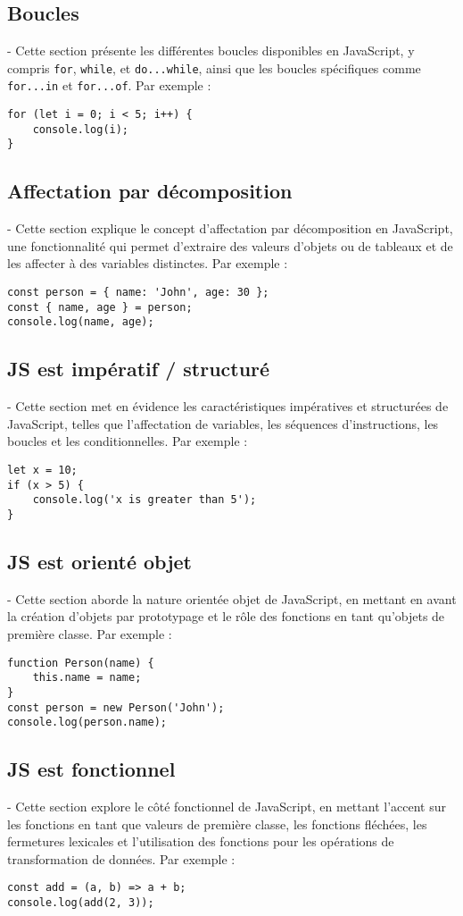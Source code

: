 \documentclass{article}
\begin{document}
\subsection{Boucles}
- Cette section présente les différentes boucles disponibles en JavaScript, y compris \texttt{for}, \texttt{while}, et \texttt{do...while}, ainsi que les boucles spécifiques comme \texttt{for...in} et \texttt{for...of}. Par exemple :
\begin{verbatim}
for (let i = 0; i < 5; i++) {
    console.log(i);
}
\end{verbatim}

\subsection{Affectation par décomposition}
- Cette section explique le concept d'affectation par décomposition en JavaScript, une fonctionnalité qui permet d'extraire des valeurs d'objets ou de tableaux et de les affecter à des variables distinctes. Par exemple :
\begin{verbatim}
const person = { name: 'John', age: 30 };
const { name, age } = person;
console.log(name, age);
\end{verbatim}

\subsection{JS est impératif / structuré}
- Cette section met en évidence les caractéristiques impératives et structurées de JavaScript, telles que l'affectation de variables, les séquences d'instructions, les boucles et les conditionnelles. Par exemple :
\begin{verbatim}
let x = 10;
if (x > 5) {
    console.log('x is greater than 5');
}
\end{verbatim}

\subsection{JS est orienté objet}
- Cette section aborde la nature orientée objet de JavaScript, en mettant en avant la création d'objets par prototypage et le rôle des fonctions en tant qu'objets de première classe. Par exemple :
\begin{verbatim}
function Person(name) {
    this.name = name;
}
const person = new Person('John');
console.log(person.name);
\end{verbatim}

\subsection{JS est fonctionnel}
- Cette section explore le côté fonctionnel de JavaScript, en mettant l'accent sur les fonctions en tant que valeurs de première classe, les fonctions fléchées, les fermetures lexicales et l'utilisation des fonctions pour les opérations de transformation de données. Par exemple :
\begin{verbatim}
const add = (a, b) => a + b;
console.log(add(2, 3));
\end{verbatim}
\end{document}
